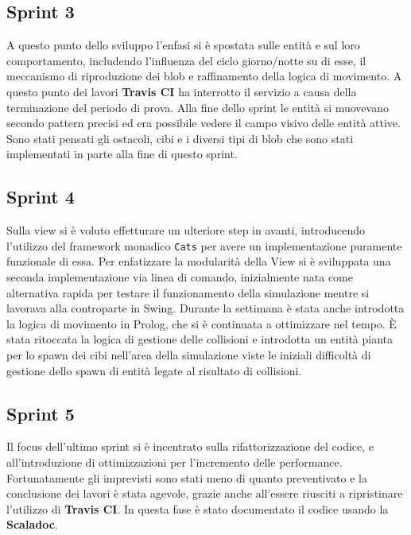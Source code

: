 \subsection{Sprint 3}
A questo punto dello sviluppo l'enfasi si è spostata sulle entità e sul loro comportamento, includendo l'influenza del ciclo giorno/notte su di esse, il meccanismo di riproduzione dei blob e raffinamento della logica di movimento. A questo punto dei lavori \textbf{Travis CI} ha interrotto il servizio a causa della terminazione del periodo di prova.  Alla fine dello sprint le entità si muovevano secondo pattern precisi ed era possibile vedere il campo visivo delle entità attive. Sono stati pensati gli ostacoli, cibi e i diversi tipi di blob che sono stati implementati in parte alla fine di questo sprint.

\subsection{Sprint 4}
Sulla view si è voluto effetturare un ulteriore step in avanti, introducendo l'utilizzo del framework monadico \texttt{Cats} per avere un implementazione puramente funzionale di essa. Per enfatizzare la modularità della View si è sviluppata una seconda implementazione via linea di comando, inizialmente nata come alternativa rapida per testare il funzionamento della simulazione mentre si lavorava alla controparte in Swing. Durante la settimana è stata anche introdotta la logica di movimento in Prolog, che si è continuata a ottimizzare nel tempo. È stata ritoccata la logica di gestione delle collisioni e introdotta un entità pianta per lo spawn dei cibi nell'area della simulazione viste le iniziali difficoltà di gestione dello spawn di entità legate al risultato di collisioni.

\subsection{Sprint 5}
Il focus dell'ultimo sprint si è incentrato sulla rifattorizzazione del codice, e all'introduzione di ottimizzazioni per l'incremento delle performance. Fortunatamente gli imprevisti sono stati meno di quanto preventivato e la conclusione dei lavori è stata agevole, grazie anche all'essere riusciti a ripristinare l'utilizzo di \textbf{Travis CI}. In questa fase è stato documentato il codice usando la \textbf{Scaladoc}.